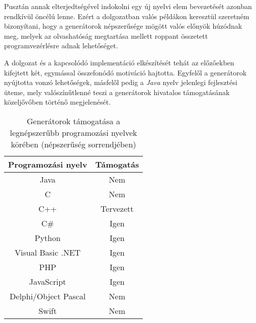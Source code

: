 Pusztán annak elterjedtségével indokolni egy új nyelvi elem bevezetését azonban rendkívül öncélú lenne. Ezért a dolgozatban valós példákon keresztül szeretném bizonyítani, hogy a generátorok népszerűsége mögött valós előnyök húzódnak meg, melyek az olvashatóság megtartása mellett roppant összetett programvezérlésre adnak lehetőséget. 

A dolgozat és a kapcsolódó implementáció elkészítését tehát az előzőekben kifejtett két, egymással összefonódó motiváció hajtotta. Egyfelől a generátorok nyújtotta vonzó lehetőségek, másfelől pedig a \textit{Java} nyelv jelenlegi fejlesztési üteme, mely valószínűtlenné teszi a generátorok hivatalos támogatásának közeljővőben történő megjelenését.

\if{}
  \begin{table}
  \captionsetup{justification=centering}
  \centering
    \begin{tabular}{|| c | c ||}
    \hline
    Programozási nyelv & Támogatás \\
    \hline \hline
    Java                  & \cellcolor{red!20}Nem \\
    C                     & \cellcolor{red!20}Nem \\
    C++                   & \cellcolor{yellow!20}Tervezett \\
    C\#                   & \cellcolor{green!20}Igen \\
    Python                & \cellcolor{green!20}Igen \\
    Visual Basic .NET     & \cellcolor{green!20}Igen \\
    PHP                   & \cellcolor{green!20}Igen \\
    JavaScript            & \cellcolor{green!20}Igen \\
    Delphi/Object Pascal  & \cellcolor{red!20}Nem \\
    Swift                 & \cellcolor{red!20}Nem \\
    \hline
    \end{tabular}
  \caption{Generátorok támogatása a legnépszerűbb programozási nyelvek körében (népszerűség sorrendjében)}  
  \label{table:1}
  \end{table}
\else
